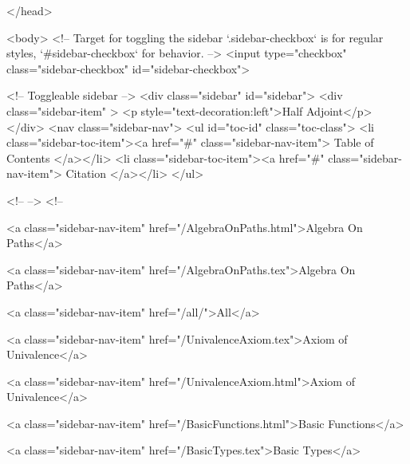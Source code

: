   
</head>




  <body>
    <!-- Target for toggling the sidebar `.sidebar-checkbox` is for regular
     styles, `#sidebar-checkbox` for behavior. -->
<input type="checkbox" class="sidebar-checkbox" id="sidebar-checkbox">

<!-- Toggleable sidebar -->
<div class="sidebar" id="sidebar">
  <div class="sidebar-item" >
    <p style="text-decoration:left">Half Adjoint</p>
  </div>
  <nav class="sidebar-nav">
    <ul id="toc-id" class="toc-class">
  <li class="sidebar-toc-item"><a href="#" class="sidebar-nav-item"> Table of Contents </a></li>
  <li class="sidebar-toc-item"><a href="#" class="sidebar-nav-item"> Citation </a></li>
</ul>


    <!--  -->
    <!-- 
      
    
      
    
      
    
      
        
      
    
      
        
          <a class="sidebar-nav-item" href="/AlgebraOnPaths.html">Algebra On Paths</a>
        
      
    
      
        
          <a class="sidebar-nav-item" href="/AlgebraOnPaths.tex">Algebra On Paths</a>
        
      
    
      
        
          <a class="sidebar-nav-item" href="/all/">All</a>
        
      
    
      
        
          <a class="sidebar-nav-item" href="/UnivalenceAxiom.tex">Axiom of Univalence</a>
        
      
    
      
        
          <a class="sidebar-nav-item" href="/UnivalenceAxiom.html">Axiom of Univalence</a>
        
      
    
      
        
          <a class="sidebar-nav-item" href="/BasicFunctions.html">Basic Functions</a>
        
      
    
      
        
          <a class="sidebar-nav-item" href="/BasicTypes.tex">Basic Types</a>
        
